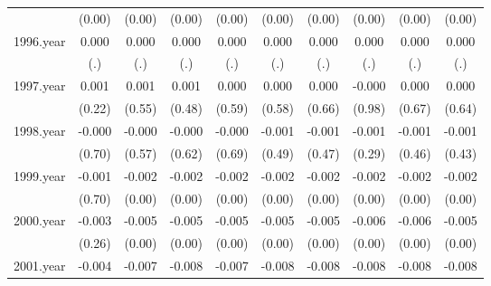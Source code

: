 {\begin{tabular}{l*{9}{c}}
          &   (0.00)         &   (0.00)         &   (0.00)         &   (0.00)         &   (0.00)         &   (0.00)         &   (0.00)         &   (0.00)         &   (0.00)         \\
[1em]
1996.year &    0.000         &    0.000         &    0.000         &    0.000         &    0.000         &    0.000         &    0.000         &    0.000         &    0.000         \\
          &      (.)         &      (.)         &      (.)         &      (.)         &      (.)         &      (.)         &      (.)         &      (.)         &      (.)         \\
[1em]
1997.year &    0.001         &    0.001         &    0.001         &    0.000         &    0.000         &    0.000         &   -0.000         &    0.000         &    0.000         \\
          &   (0.22)         &   (0.55)         &   (0.48)         &   (0.59)         &   (0.58)         &   (0.66)         &   (0.98)         &   (0.67)         &   (0.64)         \\
[1em]
1998.year &   -0.000         &   -0.000         &   -0.000         &   -0.000         &   -0.001         &   -0.001         &   -0.001         &   -0.001         &   -0.001         \\
          &   (0.70)         &   (0.57)         &   (0.62)         &   (0.69)         &   (0.49)         &   (0.47)         &   (0.29)         &   (0.46)         &   (0.43)         \\
[1em]
1999.year &   -0.001         &   -0.002\sym{***}&   -0.002\sym{**} &   -0.002\sym{***}&   -0.002\sym{***}&   -0.002\sym{***}&   -0.002\sym{***}&   -0.002\sym{***}&   -0.002\sym{**} \\
          &   (0.70)         &   (0.00)         &   (0.00)         &   (0.00)         &   (0.00)         &   (0.00)         &   (0.00)         &   (0.00)         &   (0.00)         \\
[1em]
2000.year &   -0.003         &   -0.005\sym{***}&   -0.005\sym{***}&   -0.005\sym{***}&   -0.005\sym{***}&   -0.005\sym{***}&   -0.006\sym{***}&   -0.006\sym{***}&   -0.005\sym{***}\\
          &   (0.26)         &   (0.00)         &   (0.00)         &   (0.00)         &   (0.00)         &   (0.00)         &   (0.00)         &   (0.00)         &   (0.00)         \\
[1em]
2001.year &   -0.004         &   -0.007\sym{**} &   -0.008\sym{***}&   -0.007\sym{***}&   -0.008\sym{***}&   -0.008\sym{***}&   -0.008\sym{***}&   -0.008\sym{***}&   -0.008\sym{***}\\

\end{tabular}}
